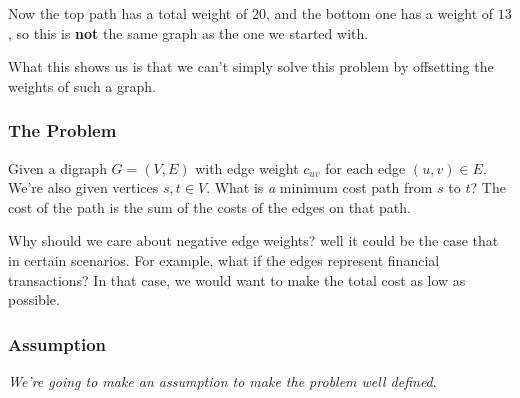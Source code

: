 \documentclass[12pt]{article}
\begin{document}
  \begin{center}
  \end{center}

  Now the top path has a total weight of $20$, and the bottom one has a weight
  of $13$, so this is {\bf not} the same graph as the one we started with.

  What this shows us is that we can't simply solve this problem by offsetting
  the weights of such a graph.

  \subsubsection{The Problem}

  Given a digraph $G = (V, E)$ with edge weight $c_{uv}$ for each edge $(u, v)
  \in E$. We're also given vertices $s, t \in V$. What is {\it a} minimum cost
  path from $s$ to $t$? The cost of the path is the sum of the costs of
  the edges on that path.

  Why should we care about negative edge weights? well it could be the case that
  in certain scenarios. For example, what if the edges represent financial
  transactions? In that case, we would want to make the total cost as low as
  possible.

  \subsubsection{Assumption}

  {\it We're going to make an assumption to make the problem well defined}.
\end{document}
